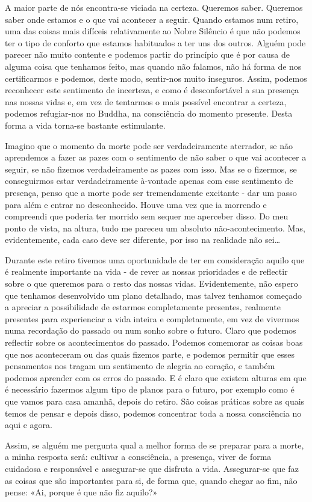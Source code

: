 A maior parte de nós encontra-se viciada na certeza. Queremos saber.
Queremos saber onde estamos e o que vai acontecer a seguir. Quando
estamos num retiro, uma das coisas mais difíceis relativamente ao Nobre
Silêncio é que não podemos ter o tipo de conforto que estamos habituados
a ter uns dos outros. Alguém pode parecer não muito contente e podemos
partir do princípio que é por causa de alguma coisa que tenhamos feito,
mas quando não falamos, não há forma de nos certificarmos e podemos,
deste modo, sentir-nos muito inseguros. Assim, podemos reconhecer este
sentimento de incerteza, e como é desconfortável a sua presença nas
nossas vidas e, em vez de tentarmos o mais possível encontrar a certeza,
podemos refugiar-nos no Buddha, na consciência do momento presente.
Desta forma a vida torna-se bastante estimulante.

Imagino que o momento da morte pode ser verdadeiramente aterrador, se
não aprendemos a fazer as pazes com o sentimento de não saber o que vai
acontecer a seguir, se não fizemos verdadeiramente as pazes com isso.
Mas se o fizermos, se conseguirmos estar verdadeiramente à-vontade
apenas com esse sentimento de presença, penso que a morte pode ser
tremendamente excitante - dar um passo para além e entrar no
desconhecido. Houve uma vez que ia morrendo e compreendi que poderia ter
morrido sem sequer me aperceber disso. Do meu ponto de vista, na altura,
tudo me pareceu um absoluto não-acontecimento. Mas, evidentemente, cada
caso deve ser diferente, por isso na realidade não sei\ldots{}

Durante este retiro tivemos uma oportunidade de ter em consideração
aquilo que é realmente importante na vida - de rever as nossas
prioridades e de reflectir sobre o que queremos para o resto das nossas
vidas. Evidentemente, não espero que tenhamos desenvolvido um plano
detalhado, mas talvez tenhamos começado a apreciar a possibilidade de
estarmos completamente presentes, realmente presentes para experienciar
a vida inteira e completamente, em vez de vivermos numa recordação do
passado ou num sonho sobre o futuro. Claro que podemos reflectir sobre
os acontecimentos do passado. Podemos comemorar as coisas boas que nos
aconteceram ou das quais fizemos parte, e podemos permitir que esses
pensamentos nos tragam um sentimento de alegria ao coração, e também
podemos aprender com os erros do passado. E é claro que existem alturas
em que é necessário fazermos algum tipo de planos para o futuro, por
exemplo como é que vamos para casa amanhã, depois do retiro. São coisas
práticas sobre as quais temos de pensar e depois disso, podemos
concentrar toda a nossa consciência no aqui e agora.

Assim, se alguém me pergunta qual a melhor forma de se preparar para a
morte, a minha resposta será: cultivar a consciência, a presença, viver
de forma cuidadosa e responsável e \mbox{assegurar-se} que disfruta a vida.
Assegurar-se que faz as coisas que são importantes para si, de forma
que, quando chegar ao fim, não pense: «Ai, porque é que não fiz aquilo?»

